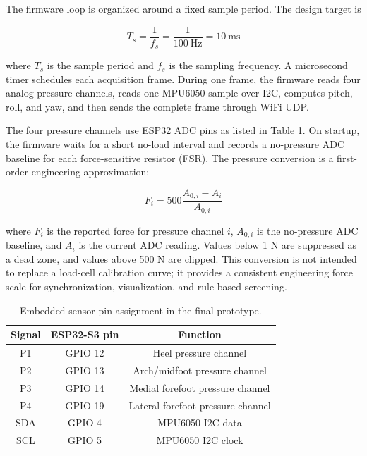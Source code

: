The firmware loop is organized around a fixed sample period. The design target is

\begin{equation}
T_s = \frac{1}{f_s} = \frac{1}{100~\mathrm{Hz}} = 10~\mathrm{ms}
\label{eq:sample_period}
\end{equation}

where $T_s$ is the sample period and $f_s$ is the sampling frequency. A microsecond timer schedules each acquisition frame. During one frame, the firmware reads four analog pressure channels, reads one MPU6050 sample over I2C, computes pitch, roll, and yaw, and then sends the complete frame through WiFi UDP.

The four pressure channels use ESP32 ADC pins as listed in Table \ref{tab:firmware_pins}. On startup, the firmware waits for a short no-load interval and records a no-pressure ADC baseline for each force-sensitive resistor (FSR). The pressure conversion is a first-order engineering approximation:

\begin{equation}
F_i =
500
\frac{A_{0,i}-A_i}{A_{0,i}}
\label{eq:pressure_adc}
\end{equation}

where $F_i$ is the reported force for pressure channel $i$, $A_{0,i}$ is the no-pressure ADC baseline, and $A_i$ is the current ADC reading. Values below 1 N are suppressed as a dead zone, and values above 500 N are clipped. This conversion is not intended to replace a load-cell calibration curve; it provides a consistent engineering force scale for synchronization, visualization, and rule-based screening.

\begin{table}[t]
\centering
\caption{Embedded sensor pin assignment in the final prototype.}
\label{tab:firmware_pins}
\begin{tabular}{|c|c|c|}
\hline
Signal & ESP32-S3 pin & Function \\
\hline
P1 & GPIO 12 & Heel pressure channel \\
P2 & GPIO 13 & Arch/midfoot pressure channel \\
P3 & GPIO 14 & Medial forefoot pressure channel \\
P4 & GPIO 19 & Lateral forefoot pressure channel \\
SDA & GPIO 4 & MPU6050 I2C data \\
SCL & GPIO 5 & MPU6050 I2C clock \\
\hline
\end{tabular}
\end{table}

